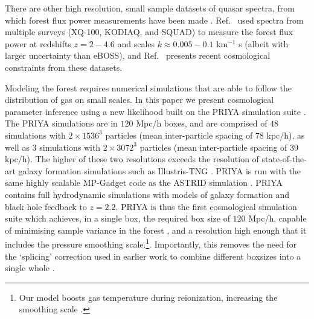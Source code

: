 There are other high resolution, small sample datasets of quasar spectra, from which \lya forest flux power measurements have been made \cite{2017MNRAS.466.4332I, 2019MNRAS.489.2536D, 2022MNRAS.509.2842K, 2022MNRAS.515..857E}. Ref.~\cite{2022MNRAS.509.2842K} used spectra from multiple surveys (XQ-100, KODIAQ, and SQUAD) to measure the \lya forest flux power at redshifts $z=2-4.6$ and scales $k\approx0.005-0.1$ km$^{-1}$ s (albeit with larger uncertainty than eBOSS), and Ref.~\cite{2022MNRAS.515..857E} presents recent cosmological constraints from these datasets.

Modeling the \lya forest requires numerical simulations that are able to follow the distribution of gas on small scales.
In this paper we present cosmological parameter inference using a new likelihood built on the PRIYA simulation suite \cite{2023simsuite}.
The PRIYA simulations are in $120$ Mpc/h boxes, and are comprised of $48$ simulations with $2\times 1536^3$ particles (mean inter-particle spacing of $78$ kpc/h), as well as $3$ simulations with $2\times 3072^3$ particles (mean inter-particle spacing of $39$ kpc/h).
The higher of these two resolutions exceeds the resolution of state-of-the-art galaxy formation simulations such as Illustris-TNG \cite{2018MNRAS.475..676S}.
PRIYA is run with the same highly scalable MP-Gadget code as the ASTRID simulation \cite{2022MNRAS.512.3703B,2022MNRAS.513..670N}.
PRIYA contains full hydrodynamic simulations with models of galaxy formation and black hole feedback to $z=2.2$.
PRIYA is thus the first cosmological simulation suite which achieves, in a single box, the required box size of $120$ Mpc/h, capable of minimising sample variance in the \lya forest \cite{2014JCAP...07..005B}, and a resolution high enough that it includes the pressure smoothing scale.\footnote{Our model boosts gas temperature during reionization, increasing the smoothing scale \cite{2023simsuite}.}.
Importantly, this removes the need for the `splicing' correction used in earlier work to combine different boxsizes into a single whole \cite{2014JCAP...07..005B,2020JCAP...04..038P}.

